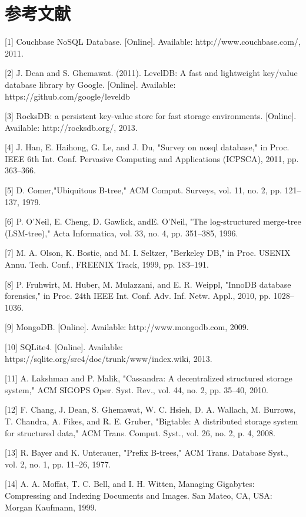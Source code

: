 \section*{参考文献}
\setlength{\parindent}{0pt}
[1] Couchbase NoSQL Database. [Online]. Available: http://www.couchbase.com/, 2011.

[2] J. Dean and S. Ghemawat. (2011). LevelDB: A fast and lightweight key/value database library by Google. [Online]. Available: https://github.com/google/leveldb

[3] RocksDB: a persistent key-value store for fast storage environments. [Online]. Available: http://rocksdb.org/, 2013.

[4] J. Han, E. Haihong, G. Le, and J. Du, "Survey on nosql database," in Proc. IEEE 6th Int. Conf. Pervasive Computing and Applications (ICPSCA), 2011, pp. 363–366.

[5] D. Comer,"Ubiquitous B-tree," ACM Comput. Surveys, vol. 11, no. 2, pp. 121–137, 1979.

[6] P. O’Neil, E. Cheng, D. Gawlick, andE. O’Neil, "The log-structured merge-tree (LSM-tree)," Acta Informatica, vol. 33, no. 4, pp. 351–385, 1996.

[7] M. A. Olson, K. Bostic, and M. I. Seltzer, "Berkeley DB," in Proc. USENIX Annu. Tech. Conf., FREENIX Track, 1999, pp. 183–191.

[8] P. Fruhwirt, M. Huber, M. Mulazzani, and E. R. Weippl, "InnoDB database forensics," in Proc. 24th IEEE Int. Conf. Adv. Inf. Netw. Appl., 2010, pp. 1028–1036.

[9] MongoDB. [Online]. Available: http://www.mongodb.com, 2009.

[10] SQLite4. [Online]. Available: https://sqlite.org/src4/doc/trunk/www/index.wiki, 2013.

[11] A. Lakshman and P. Malik, "Cassandra: A decentralized structured storage system," ACM SIGOPS Oper. Syst. Rev., vol. 44, no. 2, pp. 35–40, 2010.

[12] F. Chang, J. Dean, S. Ghemawat, W. C. Hsieh, D. A. Wallach, M. Burrows, T. Chandra, A. Fikes, and R. E. Gruber, "Bigtable: A distributed storage system for structured data," ACM Trans. Comput. Syst., vol. 26, no. 2, p. 4, 2008.

[13] R. Bayer and K. Unterauer, "Prefix B-trees," ACM Trans. Database Syst., vol. 2, no. 1, pp. 11–26, 1977.

[14] A. A. Moffat, T. C. Bell, and I. H. Witten, Managing Gigabytes: Compressing and Indexing Documents and Images. San Mateo, CA, USA: Morgan Kaufmann, 1999.

